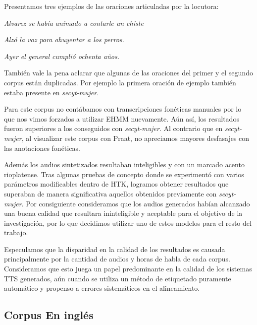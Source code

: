 Presentamos tres ejemplos de las oraciones articuladas por la locutora:

\indent\indent \textit{Alvarez se había animado a contarle un chiste}

\indent\indent \textit{Alzó la voz para ahuyentar a los perros.}

\indent\indent \textit{Ayer el general cumplió ochenta años.}

También vale la pena aclarar que algunas de las oraciones del primer y el segundo corpus están duplicadas. Por ejemplo la primera oración de ejemplo también estaba presente en \textit{secyt-mujer}.

Para este corpus no contábamos con transcripciones fonéticas manuales por lo que nos vimos forzados a utilizar EHMM nuevamente. Aún así, los resultados fueron superiores a los conseguidos con \textit{secyt-mujer}. Al contrario que en \textit{secyt-mujer}, al visualizar este corpus con Praat, no apreciamos mayores desfasajes con las anotaciones fonéticas.

Además los audios sintetizados resultaban inteligibles y con un marcado acento rioplatense. Tras algunas pruebas de concepto donde se experimentó con varios parámetros modificables dentro de HTK, logramos obtener resultados que superaban de manera significativa aquellos obtenidos previamente con \textit{secyt-mujer}. Por consiguiente consideramos que los audios generados habían alcanzado una buena calidad que resultara ininteligible y aceptable para el objetivo de la investigación, por lo que decidimos utilizar uno de estos modelos para el resto del trabajo.


Especulamos que la disparidad en la calidad de los resultados es causada principalmente por la cantidad de audios y horas de habla de cada corpus\cite{whyItSucked}. Consideramos que esto juega un papel predominante en la calidad de los sistemas TTS generados, aún cuando se utiliza un método de etiquetado puramente automático y propenso a errores sistemáticos en el alineamiento.


\subsection{Corpus En inglés}

